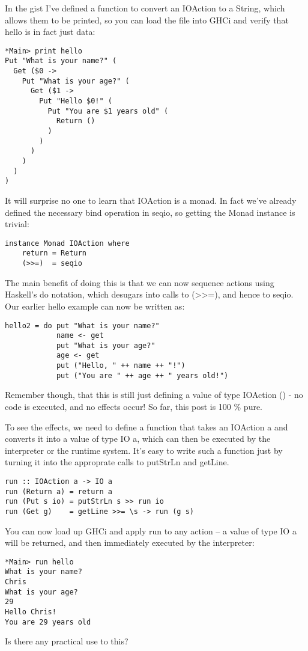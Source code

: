 \documentclass[thesis-solanki.tex]{subfiles}
\begin{document}
In the gist I’ve defined a function to convert an IOAction to a String, which allows them to be printed, so you can load the file into GHCi 
and verify that hello is in fact just data:

\begin{verbatim}
*Main> print hello
Put "What is your name?" (
  Get ($0 -> 
    Put "What is your age?" (
      Get ($1 -> 
        Put "Hello $0!" (
          Put "You are $1 years old" (
            Return ()
          )
        )
      )
    )
  )
)
\end{verbatim}
It will surprise no one to learn that IOAction is a monad. In fact we’ve already defined the necessary bind operation in seqio, so getting 
the Monad instance is trivial:
\begin{verbatim}
instance Monad IOAction where
    return = Return
    (>>=)  = seqio
\end{verbatim}

The main benefit of doing this is that we can now sequence actions using Haskell’s do notation, which desugars into calls to (>>=), and 
hence to seqio. Our earlier hello example can now be written as:

\begin{verbatim}
hello2 = do put "What is your name?"
            name <- get
            put "What is your age?"
            age <- get
            put ("Hello, " ++ name ++ "!")
            put ("You are " ++ age ++ " years old!")
\end{verbatim}
Remember though, that this is still just defining a value of type IOAction () - no code is executed, and no effects occur! So far, this post is 100 \% pure.

To see the effects, we need to define a function that takes an IOAction a and converts it into a value of type IO a, which can then be executed by the interpreter or the runtime system. It’s easy to write such a function just by turning it into the approprate calls to putStrLn and getLine.

\begin{verbatim}
run :: IOAction a -> IO a
run (Return a) = return a
run (Put s io) = putStrLn s >> run io
run (Get g)    = getLine >>= \s -> run (g s)
\end{verbatim}

You can now load up GHCi and apply run to any action – a value of type IO a will be returned, and then immediately executed by the 
interpreter:

\begin{verbatim}
*Main> run hello
What is your name?
Chris
What is your age?
29
Hello Chris!
You are 29 years old

\end{verbatim}
Is there any practical use to this?
\end{document}

